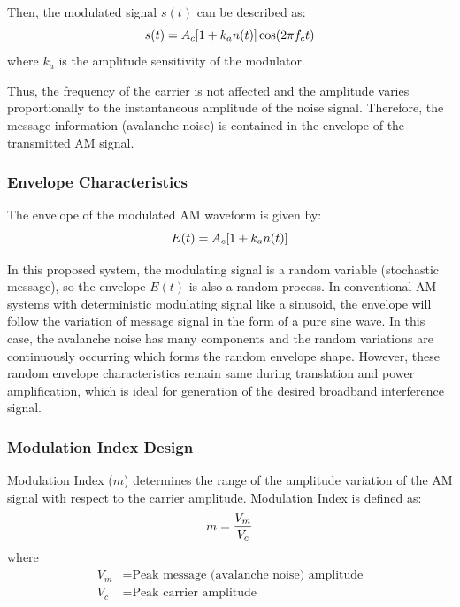 \documentclass[12pt,a4paper]{report}
\begin{document}
	Then, the modulated signal $s(t)$ can be described as:
	\begingroup
	\setlength{\mathindent}{0pt}
	\begin{equation*}
		\hfill
		s(t) = A_c [1 + k_a n(t)] \cos(2\pi f_c t)
		\hfill
	\end{equation*}
	\endgroup
	where $k_a$ is the amplitude sensitivity of the modulator.
	
	Thus, the frequency of the carrier is not affected and the amplitude varies proportionally to the instantaneous amplitude of the noise signal. Therefore, the message information (avalanche noise) is contained in the envelope of the transmitted AM signal.
	
	\subsubsection{Envelope Characteristics}
	The envelope of the modulated AM waveform is given by:
	\begingroup
	\setlength{\mathindent}{0pt}
	\begin{equation*}
		\hfill
		E(t) = A_c [1 + k_a n(t)]
		\hfill
	\end{equation*}
	\endgroup
	
	In this proposed system, the modulating signal is a random variable (stochastic message), so the envelope $E(t)$ is also a random process. In conventional AM systems with deterministic modulating signal like a sinusoid, the envelope will follow the variation of message signal in the form of a pure sine wave. In this case, the avalanche noise has many components and the random variations are continuously occurring which forms the random envelope shape. However, these random envelope characteristics remain same during translation and power amplification, which is ideal for generation of the desired broadband interference signal.
	\subsubsection{Modulation Index Design}
	Modulation Index ($m$) determines the range of the amplitude variation of the AM signal with respect to the carrier amplitude. Modulation Index is defined as:
	\begingroup
	\setlength{\mathindent}{0pt}
	\begin{equation*}
		\hfill
		m = \frac{V_m}{V_c}
		\hfill
	\end{equation*}
	\endgroup
	where
	\begin{align*}
		V_m &= \text{Peak message (avalanche noise) amplitude} \\
		V_c &= \text{Peak carrier amplitude}
	\end{align*}
	
\end{document}
